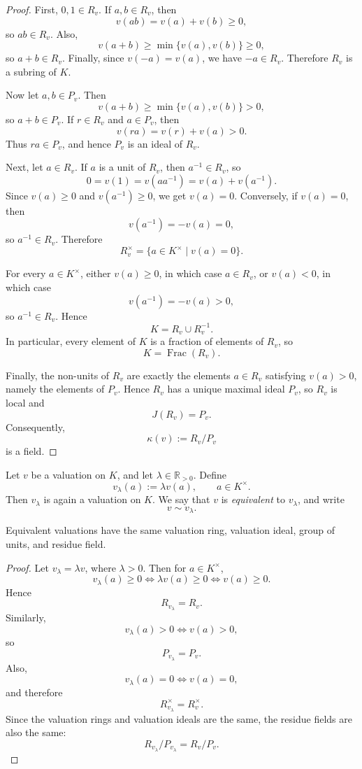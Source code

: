\begin{proof}
First, \(0,1\in R_v\). If \(a,b\in R_v\), then
\[
    v(ab)=v(a)+v(b)\geq 0,
\]
so \(ab\in R_v\). Also,
\[
    v(a+b)\geq \min\{v(a),v(b)\}\geq 0,
\]
so \(a+b\in R_v\). Finally, since \(v(-a)=v(a)\), we have \(-a\in R_v\).
Therefore \(R_v\) is a subring of \(K\).

Now let \(a,b\in P_v\). Then
\[
    v(a+b)\geq \min\{v(a),v(b)\}>0,
\]
so \(a+b\in P_v\). If \(r\in R_v\) and \(a\in P_v\), then
\[
    v(ra)=v(r)+v(a)>0.
\]
Thus \(ra\in P_v\), and hence \(P_v\) is an ideal of \(R_v\).

Next, let \(a\in R_v\). If \(a\) is a unit of \(R_v\), then \(a^{-1}\in R_v\), so
\[
    0=v(1)=v(aa^{-1})=v(a)+v(a^{-1}).
\]
Since \(v(a)\geq 0\) and \(v(a^{-1})\geq 0\), we get \(v(a)=0\). Conversely, if
\(v(a)=0\), then
\[
    v(a^{-1})=-v(a)=0,
\]
so \(a^{-1}\in R_v\). Therefore
\[
    R_v^\times=\{a\in K^\times\mid v(a)=0\}.
\]

For every \(a\in K^\times\), either \(v(a)\geq 0\), in which case \(a\in R_v\), or
\(v(a)<0\), in which case
\[
    v(a^{-1})=-v(a)>0,
\]
so \(a^{-1}\in R_v\). Hence
\[
    K=R_v\cup R_v^{-1}.
\]
In particular, every element of \(K\) is a fraction of elements of \(R_v\), so
\[
    K=\operatorname{Frac}(R_v).
\]

Finally, the non-units of \(R_v\) are exactly the elements \(a\in R_v\) satisfying
\(v(a)>0\), namely the elements of \(P_v\). Hence \(R_v\) has a unique maximal ideal
\(P_v\), so \(R_v\) is local and
\[
    J(R_v)=P_v.
\]
Consequently,
\[
    \kappa(v):=R_v/P_v
\]
is a field.
\end{proof}

\begin{definition}
Let \(v\) be a valuation on \(K\), and let \(\lambda\in\mathbb{R}_{>0}\). Define
\[
    v_\lambda(a):=\lambda v(a),\qquad a\in K^\times.
\]
Then \(v_\lambda\) is again a valuation on \(K\). We say that \(v\) is
\emph{equivalent} to \(v_\lambda\), and write
\[
    v\sim v_\lambda.
\]
\end{definition}

\begin{proposition}
Equivalent valuations have the same valuation ring, valuation ideal, group of units,
and residue field.
\end{proposition}

\begin{proof}
Let \(v_\lambda=\lambda v\), where \(\lambda>0\). Then for \(a\in K^\times\),
\[
    v_\lambda(a)\geq 0
    \iff
    \lambda v(a)\geq 0
    \iff
    v(a)\geq 0.
\]
Hence
\[
    R_{v_\lambda}=R_v.
\]
Similarly,
\[
    v_\lambda(a)>0
    \iff
    v(a)>0,
\]
so
\[
    P_{v_\lambda}=P_v.
\]
Also,
\[
    v_\lambda(a)=0
    \iff
    v(a)=0,
\]
and therefore
\[
    R_{v_\lambda}^\times=R_v^\times.
\]
Since the valuation rings and valuation ideals are the same, the residue fields are also
the same:
\[
    R_{v_\lambda}/P_{v_\lambda}=R_v/P_v.
\]
\end{proof}

